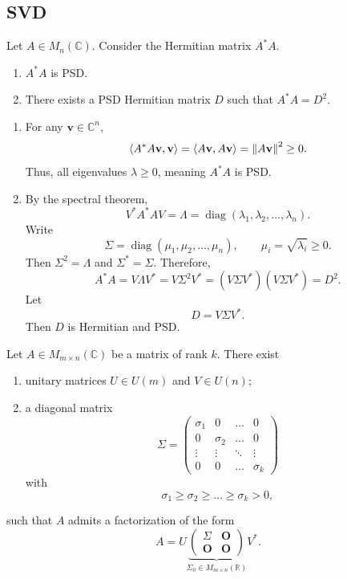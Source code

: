 \subsection{SVD}

\begin{proposition}
Let $A \in M_n(\mathbb{C})$. Consider the Hermitian matrix $A^*A$.
\begin{enumerate}
    \item $A^*A$ is PSD.
    \item There exists a PSD Hermitian matrix $D$ such that $A^*A=D^2$.
\end{enumerate}
\end{proposition}

\begin{pfbox}
\begin{enumerate}
    \item For any $\mathbf{v}\in \mathbb{C}^n$,
    \[
    \left\langle A^*A\mathbf{v}, \mathbf{v} \right\rangle
    =
    \left\langle A\mathbf{v}, A\mathbf{v} \right\rangle
    =
    \left\lVert A\mathbf{v} \right\rVert^2
    \ge 0.
    \]
    Thus, all eigenvalues $\lambda\ge 0$, meaning $A^*A$ is PSD.

    \item By the spectral theorem,
    \[
    V^*A^*AV
    =
    \Lambda
    =
    \operatorname{diag}(\lambda_1,\lambda_2,\dots,\lambda_n).
    \]
    Write
    \[
    \Sigma
    =
    \operatorname{diag}(\mu_1,\mu_2,\dots,\mu_n),
    \qquad
    \mu_i=\sqrt{\lambda_i}\ge 0.
    \]
    Then $\Sigma^2=\Lambda$ and $\Sigma^*=\Sigma$. Therefore,
    \[
    A^*A
    =
    V\Lambda V^*
    =
    V\Sigma^2V^*
    =
    (V\Sigma V^*)(V\Sigma V^*)
    =
    D^2.
    \]
    Let
    \[
    D=V\Sigma V^*.
    \]
    Then $D$ is Hermitian and PSD.
\end{enumerate}
\end{pfbox}

\begin{theorem}
Let $A \in M_{m \times n}(\mathbb{C})$ be a matrix of rank $k$.
There exist
\begin{enumerate}
    \item unitary matrices $U \in U(m)$ and $V \in U(n)$;
    \item a diagonal matrix
    \[
    \Sigma
    =
    \begin{pmatrix}
    \sigma_1 & 0 & \dots & 0 \\
    0 & \sigma_2 & \dots & 0 \\
    \vdots & \vdots & \ddots & \vdots \\
    0 & 0 & \dots & \sigma_k
    \end{pmatrix}
    \]
    with
    \[
    \sigma_1 \ge \sigma_2 \ge \dots \ge \sigma_k > 0,
    \]
\end{enumerate}
such that $A$ admits a factorization of the form
\[
A
=
U
\underbrace{
\begin{pmatrix}
\Sigma & \mathbf{O} \\
\mathbf{O} & \mathbf{O}
\end{pmatrix}}_{\Sigma_0\in M_{m \times n}(\mathbb{R})}
V^*.
\]
\end{theorem}


